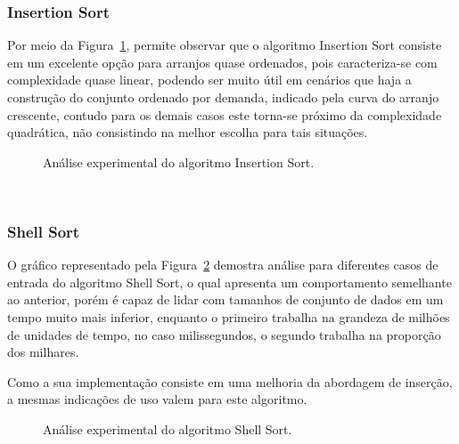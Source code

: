\documentclass[conference,onecolumn]{IEEEtran}
\begin{document}
\subsubsection{Insertion Sort}

Por meio da Figura~\ref{image: graph-insertion}, permite observar que o algoritmo Insertion Sort consiste em um excelente opção para arranjos quase ordenados, pois caracteriza-se com complexidade quase linear, podendo ser muito útil em cenários que haja a construção do conjunto ordenado por demanda, indicado pela curva do arranjo crescente, contudo para os demais casos este torna-se próximo da complexidade quadrática, não consistindo na melhor escolha para tais situações.

\begin{figure}[H]

\centering
{}
\caption{Análise experimental do algoritmo Insertion Sort.}
\label{image: graph-insertion}
\end{figure}
~\\
\subsubsection{Shell Sort}
O gráfico representado pela Figura~\ref{image: graph-shell} demostra análise para diferentes casos de entrada do algoritmo Shell Sort, o qual apresenta um comportamento semelhante ao anterior, porém é capaz de lidar com tamanhos de conjunto de dados em um tempo muito mais inferior, enquanto o primeiro trabalha na grandeza de milhões de unidades de tempo, no caso milissegundos, o segundo trabalha na proporção dos milhares. 

Como a sua implementação consiste em uma melhoria da abordagem de inserção, a mesmas indicações de uso valem para este algoritmo.


\begin{figure}[H]

\centering
{}
\caption{Análise experimental do algoritmo Shell Sort.}
\label{image: graph-shell}
\end{figure}
~\\
\end{document}
